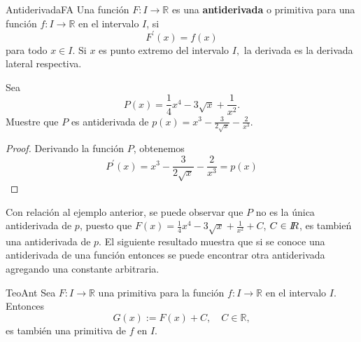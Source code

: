 \begin{definicion}{Antiderivada}{FA}\label{def-funcion-F}
Una funci\'on $F:I \to \mathbb R$ es una \textbf{antiderivada}  o primitiva para una funci\'on  $f:I \to \mathbb R$ en el intervalo $I$, si $$F^{\prime}(x)= f(x)$$  para todo $x\in I$. Si $x$ es punto extremo del intervalo $I,$ la derivada es la derivada lateral respectiva.
\end{definicion}
\vspace*{0.2cm}

\begin{Ejemplo}\label{ej1}
Sea $$P(x)=\frac{1}{4} x^{4}-3\sqrt{x}+\frac{1}{x^2}.$$ Muestre que $P$ es antiderivada de $p(x)=x^3-\frac{3}{2\sqrt{x}}-\frac{2}{x^3}$.
\end{Ejemplo}

\begin{proof}
Derivando la funci\'on $P$, obtenemos
$$P^{\prime}(x)=x^3-\frac{3}{2\sqrt{x}}-\frac{2}{x^3}=p(x)$$ 
\end{proof}



\noindent Con relaci\'on al ejemplo anterior, se puede observar que $P$ no es la \'unica antiderivada de $p$, puesto que $F(x)=\frac{1}{4} x^{4}-3\sqrt{x}+\frac{1}{x^2}+C$, $C\in I\!\! R$,  es tambie\'n una antiderivada de $p$. El siguiente resultado muestra que si se conoce una antiderivada  de una funci\'on entonces se puede encontrar otra antiderivada agregando una constante arbitraria.   

\begin{proposicion}{}{TeoAnt}\label{teo-antiderivada-G}
Sea $F:I \to \mathbb R$ una primitiva para la funci\'on  $f:I \to \mathbb R$ en el intervalo $I.$ Entonces
$$G(x):=F(x)+C, \quad C\in\mathbb R,$$ es tambi\'en una primitiva de $f$ en $I.$
\end{proposicion}

